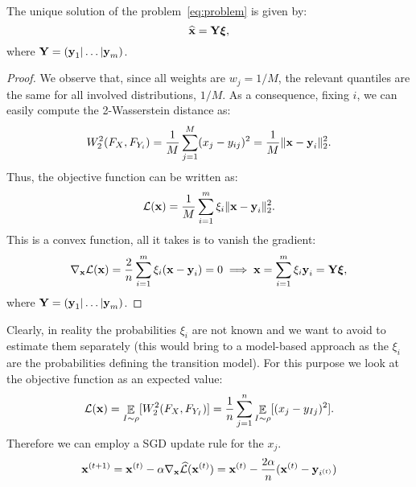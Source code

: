 \begin{theorem}
	The unique solution of the problem~\ref{eq:problem} is given by:
    \begin{equation}
    	\widehat{\bm{\mathbf{x}}} = \bm{\mathbf{Y}} \bm{\mathbf{\xi}},
    \end{equation}
    where $\bm{\mathbf{Y}} = (\bm{\mathbf{y}}_1 | \dots | \bm{\mathbf{y}}_m)$.
\end{theorem}

\begin{proof}
	We observe that, since all weights are $w_j = 1/M$, the relevant quantiles are the same for all involved distributions, \ie $1/M$. As a consequence, fixing $i$, we can easily compute the 2-Wasserstein distance as:
    \begin{equation}
    	W_2^2 (F_X, F_{Y_i}) = \frac{1}{M} \sum_{j=1}^M (x_j - y_{ij})^2 = \frac{1}{M} \| \bm{\mathbf{x}} - \bm{\mathbf{y}}_i \|^2_2.
    \end{equation}
    Thus, the objective function can be written as:
    \begin{equation}
    	\mathcal{L}(\bm{\mathbf{x}}) = \frac{1}{M} \sum_{i=1}^m \xi_i \| \bm{\mathbf{x}} - \bm{\mathbf{y}}_i \|^2_2.
    \end{equation}
    This is a convex function, all it takes is to vanish the gradient:
    \begin{equation}
    	\nabla_{\bm{\mathbf{x}}} \mathcal{L}(\bm{\mathbf{x}}) = \frac{2}{n} \sum_{i=1}^m \xi_i (\bm{\mathbf{x}} - \bm{\mathbf{y}}_i) = 0 \implies \bm{\mathbf{x}} =  \sum_{i=1}^m \xi_i \bm{\mathbf{y}}_i = \bm{\mathbf{Y}} \bm{\mathbf{\xi}},
    \end{equation}
    where $\bm{\mathbf{Y}} = (\bm{\mathbf{y}}_1 | \dots | \bm{\mathbf{y}}_m)$.
\end{proof}

Clearly, in reality the probabilities $\xi_i$ are not known and we want to avoid to estimate them separately (this would bring to a model-based approach as the $\xi_i$ are the probabilities defining the transition model). For this purpose we look at the objective function as an expected value:
\begin{equation}
	 \mathcal{L}(\bm{\mathbf{x}}) = \displaystyle \mathop{\mathbb{E}}_{I \sim \rho} [W_2^2(F_X, F_{Y_I})] = \frac{1}{n} \sum_{j=1}^n \displaystyle \mathop{\mathbb{E}}_{I \sim \rho} [(x_j - y_{Ij})^2].
\end{equation}
Therefore we can employ a SGD update rule for the $x_j$.
\begin{equation}
	\bm{\mathbf{x}}^{(t+1)} = \bm{\mathbf{x}}^{(t)} - \alpha \nabla_{\bm{\mathbf{x}}} \widehat{\mathcal{L}}(\bm{\mathbf{x}}^{(t)} ) =  \bm{\mathbf{x}}^{(t)} - \frac{2\alpha}{n} (\bm{\mathbf{x}}^{(t)} -\bm{\mathbf{y}}_{i^{(t)}} )
\end{equation}

